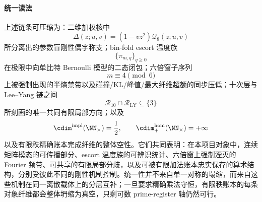 \paragraph{统一读法}
上述链条可压缩为：二维加权核中
\[
\Delta(z;u,v)=(1-vz^2)\mathcal Q_8(z;u,v)
\]
所分离出的参数盲刚性偶宇称支；bin-fold escort 温度族
\[
\{\pi_{m,q}\}_{q\ge 0}
\]
在极限中向单比特 Bernoulli 模型的二态闭包；六倍窗子序列
\[
m\equiv 4\pmod 6
\]
上被强制出现的半熵禁带以及碰撞/KL/峰值/最大纤维超额的同步压低；十次层与 Lee--Yang 链之间
\[
\mathcal R_{10}\cap \mathcal R_{\mathrm{LY}}\subseteq \{3\}
\]
所刻画的唯一共同有限局部方向；以及
\[
\cdim^{\mathrm{impl}}(\NN_{\times})=\frac12,
\qquad
\cdim^{\mathrm{hom}}_{+}(\NN_{\times})=+\infty
\]
以及有限秩精确账本完成纤维的整体空性。它们共同表明：在本项目对象中，连续矩阵模态的可传播部分、escort 温度族的可辨识统计、六倍窗上强制湮灭的 Fourier 频带、可共享的有限局部分歧，以及可被有限加法账本忠实保存的算术结构，分别受彼此不同的刚性机制控制。统一性并不来自单一对称的塌缩，而来自这些机制在同一离散载体上的分层互补；一旦要求精确乘法守恒，有限秩账本的每条对象纤维都会整体坍缩为真空，只剩可数 prime-register 轴仍然可行。

\endinput
